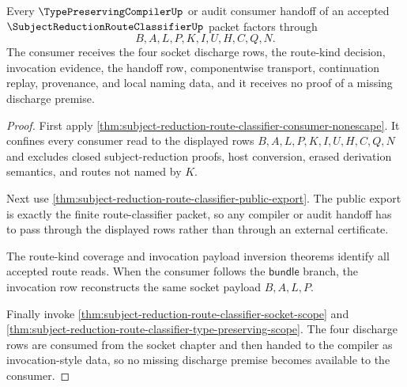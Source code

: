 \begin{theorem}
\label{thm:subject-reduction-route-classifier-consumer-route-totality}
Every $\TypePreservingCompilerUp$ or audit consumer handoff of an accepted $\SubjectReductionRouteClassifierUp$ packet factors through
$$
B,A,L,P,K,I,U,H,C,Q,N.
$$
The consumer receives the four socket discharge rows, the route-kind decision, invocation evidence, the handoff row, componentwise transport, continuation replay, provenance, and local naming data, and it receives no proof of a missing discharge premise.
\end{theorem}
\begin{proof}
First apply \autoref{thm:subject-reduction-route-classifier-consumer-nonescape}. It confines every consumer read to the displayed rows $B,A,L,P,K,I,U,H,C,Q,N$ and excludes closed subject-reduction proofs, host conversion, erased derivation semantics, and routes not named by $K$.

Next use \autoref{thm:subject-reduction-route-classifier-public-export}. The public export is exactly the finite route-classifier packet, so any compiler or audit handoff has to pass through the displayed rows rather than through an external certificate.

The route-kind coverage and invocation payload inversion theorems identify all accepted route reads. When the consumer follows the $\mathsf{bundle}$ branch, the invocation row reconstructs the same socket payload $B,A,L,P$.

Finally invoke \autoref{thm:subject-reduction-route-classifier-socket-scope} and \autoref{thm:subject-reduction-route-classifier-type-preserving-scope}. The four discharge rows are consumed from the socket chapter and then handed to the compiler as invocation-style data, so no missing discharge premise becomes available to the consumer.
\end{proof}

